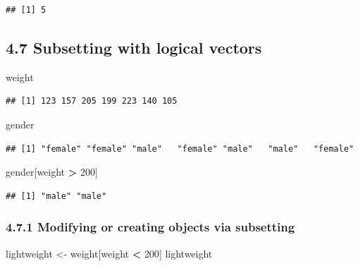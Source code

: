 \documentclass[]{article}
\newenvironment{Shaded}{\begin{snugshade}}{\end{snugshade}}
\newcommand{\DecValTok}[1]{\textcolor[rgb]{0.00,0.00,0.81}{#1}}
\newcommand{\StringTok}[1]{\textcolor[rgb]{0.31,0.60,0.02}{#1}}
\newcommand{\OperatorTok}[1]{\textcolor[rgb]{0.81,0.36,0.00}{\textbf{#1}}}
\newcommand{\NormalTok}[1]{#1}
\begin{document}
\begin{verbatim}
## [1] 5
\end{verbatim}

\subsection{4.7 Subsetting with logical
vectors}\label{subsetting-with-logical-vectors}

\begin{Shaded}
\begin{Highlighting}[]
\NormalTok{weight}
\end{Highlighting}
\end{Shaded}

\begin{verbatim}
## [1] 123 157 205 199 223 140 105
\end{verbatim}

\begin{Shaded}
\begin{Highlighting}[]
\NormalTok{gender}
\end{Highlighting}
\end{Shaded}

\begin{verbatim}
## [1] "female" "female" "male"   "female" "male"   "male"   "female"
\end{verbatim}

\begin{Shaded}
\begin{Highlighting}[]
\NormalTok{gender[weight }\OperatorTok{>}\StringTok{ }\DecValTok{200}\NormalTok{]}
\end{Highlighting}
\end{Shaded}

\begin{verbatim}
## [1] "male" "male"
\end{verbatim}

\subsubsection{4.7.1 Modifying or creating objects via
subsetting}\label{modifying-or-creating-objects-via-subsetting}

\begin{Shaded}
\begin{Highlighting}[]
\NormalTok{lightweight <-}\StringTok{ }\NormalTok{weight[weight }\OperatorTok{<}\StringTok{ }\DecValTok{200}\NormalTok{]}
\NormalTok{lightweight}
\end{Highlighting}
\end{Shaded}
\end{document}
